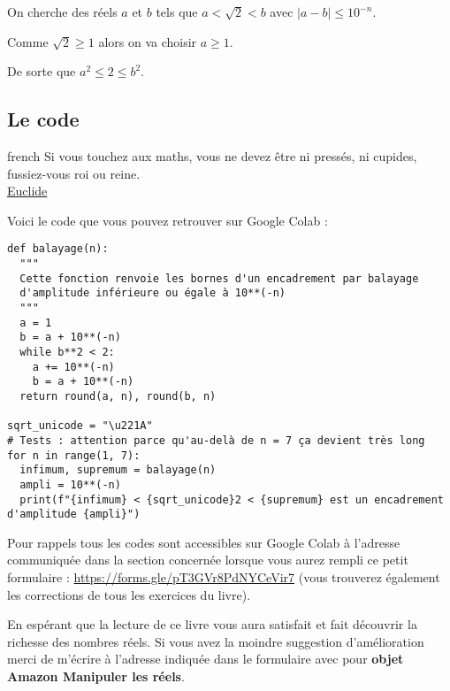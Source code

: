 \documentclass[a4paper, 11pt, twoside]{article}
\begin{document}
\startcontents[level-2]

On cherche des réels \(a\) et \(b\) tels que \(a < \sqrt{2} < b\) avec
\(\lvert a - b \rvert \leq 10^{-n}\).

Comme \(\sqrt{2} \geq 1\) alors on va choisir \(a \geq 1\).

De sorte que \(a^2 \leq 2 \leq b^2\).
\stopcontents[level-2]

\subsection{Le code}
\label{sec:org3477024}

\begin{foreigndisplayquote}{french}
Si vous touchez aux maths, vous ne devez être ni pressés, ni
cupides, fussiez-vous roi ou reine. \\

\href{https://amzn.to/3KU1CZE}{Euclide} 
\end{foreigndisplayquote}

\startcontents[level-2]

Voici le code que vous pouvez retrouver sur Google Colab :

\begin{verbatim}
def balayage(n):
  """
  Cette fonction renvoie les bornes d'un encadrement par balayage
  d'amplitude inférieure ou égale à 10**(-n)
  """
  a = 1
  b = a + 10**(-n)
  while b**2 < 2:
    a += 10**(-n)
    b = a + 10**(-n)
  return round(a, n), round(b, n)

sqrt_unicode = "\u221A"
# Tests : attention parce qu'au-delà de n = 7 ça devient très long 
for n in range(1, 7):
  infimum, supremum = balayage(n)
  ampli = 10**(-n)
  print(f"{infimum} < {sqrt_unicode}2 < {supremum} est un encadrement d'amplitude {ampli}")
\end{verbatim}

Pour rappels tous les codes sont accessibles sur Google Colab à
l'adresse communiquée dans la section concernée lorsque vous
aurez rempli ce petit formulaire :
\url{https://forms.gle/pT3GVr8PdNYCeVir7} (vous trouverez également
les corrections de tous les exercices du livre).

En espérant que la lecture de ce livre vous aura satisfait et fait
découvrir la richesse des nombres réels. Si vous avez la moindre
suggestion d'amélioration merci de m'écrire à l'adresse
indiquée dans le formulaire avec pour \textbf{objet Amazon Manipuler les réels}.
\stopcontents[level-2]
\stopcontents[level-1]
\end{document}
